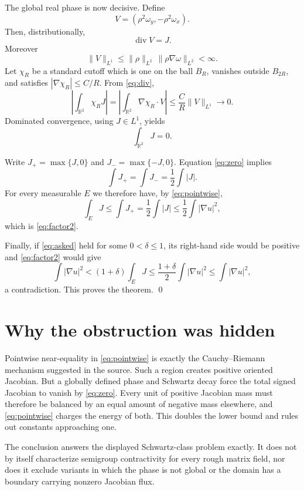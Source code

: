 \documentclass[10pt]{article}
\newcommand{\R}{\mathbb R}
\begin{document}
The global real phase is now decisive.  Define
\[
 V=(\rho^2\omega_y,-\rho^2\omega_x).
\]
Then, distributionally,
\begin{equation}\label{eq:div}
 \operatorname{div}V=J.
\end{equation}
Moreover
\[
 \|V\|_{L^1}
 \leq \|\rho\|_{L^2}\,\|\rho\nabla\omega\|_{L^2}<\infty.
\]
Let $\chi_R$ be a standard cutoff which is one on the ball $B_R$, vanishes
outside $B_{2R}$, and satisfies $|\nabla\chi_R|\leq C/R$.  From
\eqref{eq:div},
\[
 \left|\int_{\R^2}\chi_RJ\right|
 =\left|\int_{\R^2}\nabla\chi_R\cdot V\right|
 \leq \frac CR\|V\|_{L^1}\longrightarrow0.
\]
Dominated convergence, using $J\in L^1$, yields
\begin{equation}\label{eq:zero}
 \int_{\R^2}J=0.
\end{equation}

Write $J_+=\max\{J,0\}$ and $J_-=\max\{-J,0\}$.  Equation
\eqref{eq:zero} implies
\[
 \int J_+=\int J_-=\frac12\int|J|.
\]
For every measurable $E$ we therefore have, by \eqref{eq:pointwise},
\[
 \int_EJ
 \leq\int J_+
 =\frac12\int|J|
 \leq\frac12\int|\nabla u|^2,
\]
which is \eqref{eq:factor2}.

Finally, if \eqref{eq:asked} held for some $0<\delta\leq1$, its right-hand
side would be positive and \eqref{eq:factor2} would give
\[
 \int|\nabla u|^2
 <(1+\delta)\int_EJ
 \leq\frac{1+\delta}{2}\int|\nabla u|^2
 \leq\int|\nabla u|^2,
\]
a contradiction.  This proves the theorem. \qed

\section{Why the obstruction was hidden}

Pointwise near-equality in \eqref{eq:pointwise} is exactly the
Cauchy--Riemann mechanism suggested in the source.  Such a region creates
positive oriented Jacobian.  But a globally defined phase and Schwartz
decay force the total signed Jacobian to vanish by \eqref{eq:zero}.  Every
unit of positive Jacobian mass must therefore be balanced by an equal amount
of negative mass elsewhere, and \eqref{eq:pointwise} charges the energy of
both.  This doubles the lower bound and rules out constants approaching one.

The conclusion answers the displayed Schwartz-class problem exactly.  It
does not by itself characterize semigroup contractivity for every rough
matrix field, nor does it exclude variants in which the phase is not global
or the domain has a boundary carrying nonzero Jacobian flux.
\end{document}
